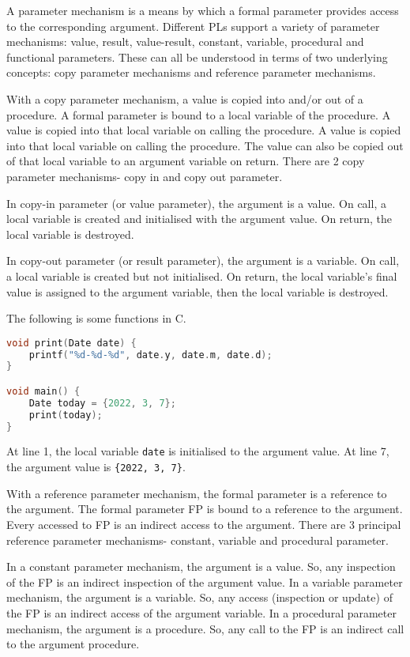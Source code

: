 \documentclass[a4paper, openany]{memoir}
\begin{document}
A parameter mechanism is a means by which a formal parameter provides access to the corresponding argument. Different PLs support a variety of parameter mechanisms: value, result, value-result, constant, variable, procedural and functional parameters. These can all be understood in terms of two underlying concepts: copy parameter mechanisms and reference parameter mechanisms.

With a copy parameter mechanism, a value is copied into and/or out of a procedure. A formal parameter is bound to a local variable of the procedure. A value is copied into that local variable on calling the procedure. A value is copied into that local variable on calling the procedure. The value can also be copied out of that local variable to an argument variable on return. There are 2 copy parameter mechanisms- copy in and copy out parameter.

In copy-in parameter (or value parameter), the argument is a value. On call, a local variable is created and initialised with the argument value. On return, the local variable is destroyed.

In copy-out parameter (or result parameter), the argument is a variable. On call, a local variable is created but not initialised. On return, the local variable's final value is assigned to the argument variable, then the local variable is destroyed.

The following is some functions in C.
\begin{lstlisting}[language=C]
void print(Date date) {
    printf("%d-%d-%d", date.y, date.m, date.d);
}

void main() {
    Date today = {2022, 3, 7};
    print(today);
}
\end{lstlisting}
At line 1, the local variable \texttt{date} is initialised to the argument value. At line 7, the argument value is \texttt{\{2022, 3, 7\}}.

With a reference parameter mechanism, the formal parameter is a reference to the argument. The formal parameter FP is bound to a reference to the argument. Every accessed to FP is an indirect access to the argument. There are 3 principal reference parameter mechanisms- constant, variable and procedural parameter.

In a constant parameter mechanism, the argument is a value. So, any inspection of the FP is an indirect inspection of the argument value. In a variable parameter mechanism, the argument is a variable. So, any access (inspection or update) of the FP is an indirect access of the argument variable. In a procedural parameter mechanism, the argument is a procedure. So, any call to the FP is an indirect call to the argument procedure.
\end{document}
